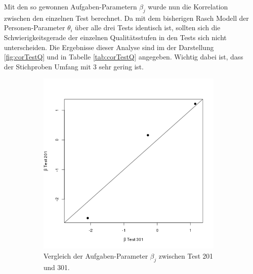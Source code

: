  Mit den so gewonnen Aufgaben-Parametern $\beta_j$ wurde nun die Korrelation zwischen den einzelnen Test berechnet. Da mit dem bisherigen Rasch Modell der Personen-Parameter $\theta_i$ über alle drei Tests identisch ist, sollten sich die Schwierigkeitsgerade der einzelnen Qualitätsstufen in den Tests sich nicht unterscheiden. Die Ergebnisse dieser Analyse sind im der Darstellung \ref{fig:corTestQ} und in Tabelle \ref{tab:corTestQ} angegeben. Wichtig dabei ist, dass der Stichproben Umfang mit 3 sehr gering ist. 
 
 
  \begin{figure}[htp]
  \centering
  \begin{subfigure}{0.32\textwidth}
    \includegraphics[width=1.0\linewidth]{graphics/GOF201301.png}
    \caption{Vergleich der Aufgaben-Parameter $\beta_j$ zwischen Test 201 und 301.}
    \label{fig:cor201301}
  \end{subfigure}
  \begin{subfigure}{0.32\textwidth}

\end{subfigure}
\end{figure}
